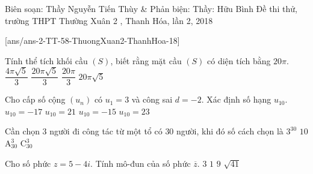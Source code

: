 \begin{name}
{Biên soạn: Thầy Nguyễn Tiến Thùy \& Phản biện: Thầy: Hữu Bình}
{Đề thi thử, trường THPT Thường Xuân 2 , Thanh Hóa, lần 2, 2018}
\end{name}
\setcounter{ex}{0}
[ans/ans-2-TT-58-ThuongXuan2-ThanhHoa-18]
\begin{ex}%
Tính thể tích khối cầu $(S)$, biết rằng mặt cầu $(S)$ có diện tích bằng $20\pi$.
\choice
{$\dfrac{4\pi\sqrt{5}}{3}$}
{\True $\dfrac{20\pi\sqrt{5}}{3}$}
{$\dfrac{20\pi}{3}$}
{$20\pi\sqrt{5}$}
\end{ex}

\begin{ex}%
Cho cấp số cộng $(u_n)$ có $u_1=3$ và công sai $d=-2$. Xác định số hạng $u_{10}$.
\choice
{$u_{10}=-17$}
{$u_{10}=21$}
{\True $u_{10}=-15$}
{$u_{10}=23$}
\end{ex}

\begin{ex}%
Cần chọn $3$ người đi công tác từ một tổ có $30$ người, khi đó số cách chọn là
\choice
{$3^{30}$}
{$10$}
{$\mathrm{A}^3_{30}$}
{\True $\mathrm{C}^3_{30}$}
\end{ex}

\begin{ex}%
Cho số phức $z=5-4i$. Tính mô-đun của số phức $\overline{z}$.
\choice
{$3$}
{$1$}
{$9$}
{\True $\sqrt{41}$}
\end{ex}

